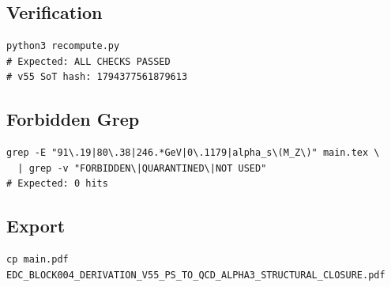 \documentclass[11pt,a4paper]{article}
\theoremstyle{definition}
\begin{document}
\subsection{Verification}
\label{subsec:verification}

\begin{verbatim}
python3 recompute.py
# Expected: ALL CHECKS PASSED
# v55 SoT hash: 1794377561879613
\end{verbatim}

\subsection{Forbidden Grep}
\label{subsec:forbidden-grep}

\begin{verbatim}
grep -E "91\.19|80\.38|246.*GeV|0\.1179|alpha_s\(M_Z\)" main.tex \
  | grep -v "FORBIDDEN\|QUARANTINED\|NOT USED"
# Expected: 0 hits
\end{verbatim}

\subsection{Export}
\label{subsec:export}

\begin{verbatim}
cp main.pdf EDC_BLOCK004_DERIVATION_V55_PS_TO_QCD_ALPHA3_STRUCTURAL_CLOSURE.pdf
\end{verbatim}

\end{document}
